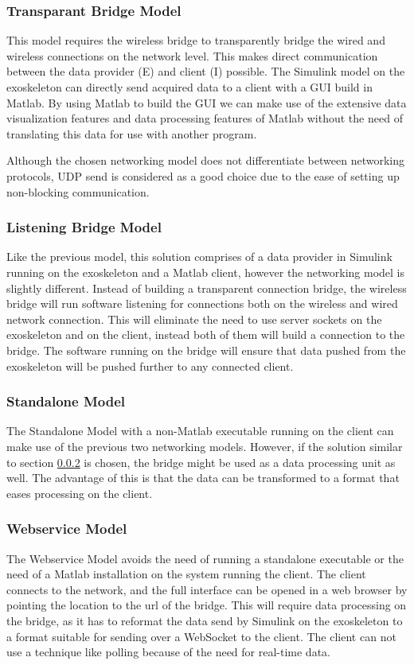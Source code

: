 \subsubsection{Transparant Bridge Model}
This model requires the wireless bridge to transparently bridge the wired and wireless connections on the network level. This makes direct communication between the data provider (E) and client (I) possible. The Simulink model on the exoskeleton can directly send acquired data to a client with a GUI build in Matlab. By using Matlab to build the GUI we can make use of the extensive data visualization features and data processing features of Matlab without the need of translating this data for use with another program. 

Although the chosen networking model does not differentiate between networking protocols, UDP send \cite{web:UDPSend} is considered as a good choice due to the ease of setting up non-blocking communication.

\subsubsection{Listening Bridge Model}\label{sec:lbm}
Like the previous model, this solution comprises of a data provider in Simulink running on the exoskeleton and a Matlab client, however the networking model is slightly different. Instead of building a transparent connection bridge, the wireless bridge will run software listening for connections both on the wireless and wired network connection. This will eliminate the need to use server sockets on the exoskeleton and on the client, instead both of them will build a connection to the bridge. The software running on the bridge will ensure that data pushed from the exoskeleton will be pushed further to any connected client.

\subsubsection{Standalone Model}
The Standalone Model with a non-Matlab executable running on the client can make use of the previous two networking models. However, if the solution similar to section \ref{sec:lbm} is chosen, the bridge might be used as a data processing unit as well. The advantage of this is that the data can be transformed to a format that eases processing on the client.

\subsubsection{Webservice Model}
The Webservice Model avoids the need of running a standalone executable or the need of a Matlab installation on the system running the client. The client connects to the network, and the full interface can be opened in a web browser by pointing the location to the url of the bridge. This will require data processing on the bridge, as it has to reformat the data send by Simulink on the exoskeleton to a format suitable for sending over a WebSocket to the client. The client can not use a technique like polling because of the need for real-time data.

